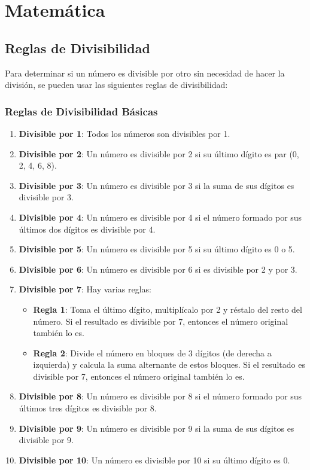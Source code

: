 \chapter{Matemática}

\section{Reglas de Divisibilidad}

Para determinar si un número es divisible por otro sin necesidad de hacer la división, se pueden usar las siguientes reglas de divisibilidad:

\subsection{Reglas de Divisibilidad Básicas}

\begin{enumerate}
	\item \textbf{Divisible por 1}: Todos los números son divisibles por 1.
	\item \textbf{Divisible por 2}: Un número es divisible por 2 si su último dígito es par (0, 2, 4, 6, 8).
	\item \textbf{Divisible por 3}: Un número es divisible por 3 si la suma de sus dígitos es divisible por 3.
	\item \textbf{Divisible por 4}: Un número es divisible por 4 si el número formado por sus últimos dos dígitos es divisible por 4.
	\item \textbf{Divisible por 5}: Un número es divisible por 5 si su último dígito es 0 o 5.
	\item \textbf{Divisible por 6}: Un número es divisible por 6 si es divisible por 2 y por 3.
	\item \textbf{Divisible por 7}: Hay varias reglas:
	\begin{itemize}
		\item \textbf{Regla 1}: Toma el último dígito, multiplícalo por 2 y réstalo del resto del número. Si el resultado es divisible por 7, entonces el número original también lo es.
		\item \textbf{Regla 2}: Divide el número en bloques de 3 dígitos (de derecha a izquierda) y calcula la suma alternante de estos bloques. Si el resultado es divisible por 7, entonces el número original también lo es.
	\end{itemize}
	\item \textbf{Divisible por 8}: Un número es divisible por 8 si el número formado por sus últimos tres dígitos es divisible por 8.
	\item \textbf{Divisible por 9}: Un número es divisible por 9 si la suma de sus dígitos es divisible por 9.
	\item \textbf{Divisible por 10}: Un número es divisible por 10 si su último dígito es 0.
\end{enumerate}

